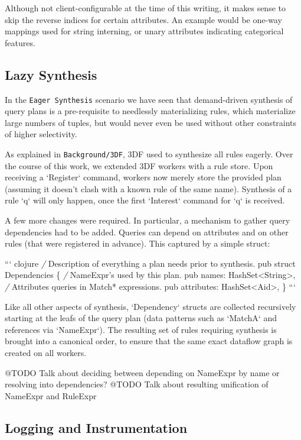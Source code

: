 \documentclass[../index.tex]{subfiles}
\begin{document}
Although not client-configurable at the time of this writing, it makes
sense to skip the reverse indices for certain attributes. An example
would be one-way mappings used for string interning, or unary
attributes indicating categorical features.

\subsection{Lazy Synthesis} \label{lazy-synthesis}

In the \texttt{Eager Synthesis} scenario we have seen that demand-driven
synthesis of query plans is a pre-requisite to needlessly
materializing rules, which materialize large numbers of tuples, but
would never even be used without other constraints of higher
selectivity.

As explained in \texttt{Background/3DF}, 3DF used to synthesize all rules
eagerly. Over the course of this work, we extended 3DF workers with a
rule store. Upon receiving a `Register` command, workers now merely
store the provided plan (assuming it doesn't clash with a known rule
of the same name). Synthesis of a rule `q` will only happen, once the
first `Interest` command for `q` is received.

A few more changes were required. In particular, a mechanism to gather
query dependencies had to be added. Queries can depend on attributes
and on other rules (that were registered in advance). This captured by
a simple struct:

``` clojure
\emph{/} Description of everything a plan needs prior to synthesis.
pub struct Dependencies \{
    \emph{/} NameExpr's used by this plan.
    pub names: HashSet<String>,
    \emph{/} Attributes queries in Match* expressions.
    pub attributes: HashSet<Aid>,
\}
```

Like all other aspects of synthesis, `Dependency` structs are
collected recursively starting at the leafs of the query plan (data
patterns such as `MatchA` and references via `NameExpr`). The
resulting set of rules requiring synthesis is brought into a canonical
order, to ensure that the same exact dataflow graph is created on all
workers.

@TODO Talk about deciding between depending on NameExpr by name or resolving into dependencies?
@TODO Talk about resulting unification of NameExpr and RuleExpr

\subsection{Logging and Instrumentation} \label{logging}
\end{document}
